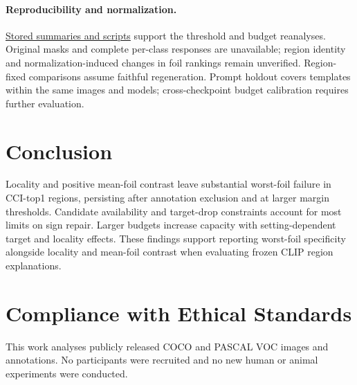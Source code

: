 \documentclass[10pt]{article}
\begin{document}
\paragraph{Reproducibility and normalization.}
\href{https://github.com/jovial-liu/conway/tree/paper/verified-rerun-integration/experiments}{Stored summaries and scripts} support the threshold and budget reanalyses.
Original masks and complete per-class responses are unavailable; region
identity and normalization-induced changes in foil rankings remain
unverified. Region-fixed comparisons assume faithful regeneration.
Prompt holdout covers templates within the same images and models;
cross-checkpoint budget calibration requires further evaluation.

\section{Conclusion}
Locality and positive mean-foil contrast leave substantial worst-foil failure
in CCI-top1 regions, persisting after annotation exclusion and at larger
margin thresholds. Candidate availability and target-drop constraints
account for most limits on sign repair. Larger budgets increase capacity
with setting-dependent target and locality effects. These findings support
reporting worst-foil specificity alongside locality and mean-foil contrast
when evaluating frozen CLIP region explanations.

\clearpage

\section*{Compliance with Ethical Standards}
This work analyses publicly released COCO and PASCAL VOC images and
annotations. No participants were recruited and no new human or animal
experiments were conducted.
\end{document}
